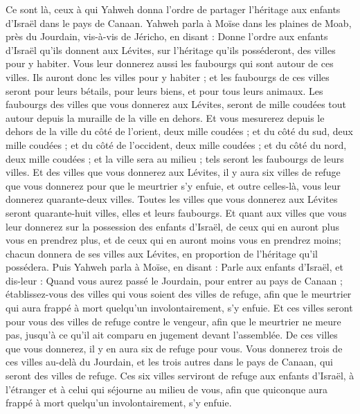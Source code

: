 \begin{multicols}{2}
Ce sont là, ceux à qui Yahweh donna l'ordre de partager l'héritage aux enfants d'Israël dans le pays de Canaan.
\VerseOne{}Yahweh parla à Moïse dans les plaines de Moab, près du Jourdain, vis-à-vis de Jéricho, en disant :
Donne l'ordre aux enfants d'Israël qu’ils donnent aux Lévites, sur l'héritage qu'ils posséderont, des villes pour y habiter. Vous leur donnerez aussi les faubourgs qui sont autour de ces villes.
Ils auront donc les villes pour y habiter ; et les faubourgs de ces villes seront pour leurs bétails, pour leurs biens, et pour tous leurs animaux.
Les faubourgs des villes que vous donnerez aux Lévites, seront de mille coudées tout autour depuis la muraille de la ville en dehors.
Et vous mesurerez depuis le dehors de la ville du côté de l'orient, deux mille coudées ; et du côté du sud, deux mille coudées ; et du côté de l'occident, deux mille coudées ; et du côté du nord, deux mille coudées ; et la ville sera au milieu ; tels seront les faubourgs de leurs villes.
Et des villes que vous donnerez aux Lévites, il y aura six villes de refuge que vous donnerez pour que le meurtrier s’y enfuie, et outre celles-là, vous leur donnerez quarante-deux villes.
Toutes les villes que vous donnerez aux Lévites seront quarante-huit villes, elles et leurs faubourgs.
Et quant aux villes que vous leur donnerez sur la possession des enfants d'Israël, de ceux qui en auront plus vous en prendrez plus, et de ceux qui en auront moins vous en prendrez moins; chacun donnera de ses villes aux Lévites, en proportion de l'héritage qu'il possédera.
Puis Yahweh parla à Moïse, en disant :
Parle aux enfants d'Israël, et dis-leur : Quand vous aurez passé le Jourdain, pour entrer au pays de Canaan ;
établissez-vous des villes qui vous soient des villes de refuge, afin que le meurtrier qui aura frappé à mort quelqu'un involontairement, s’y enfuie.
Et ces villes seront pour vous des villes de refuge contre le vengeur, afin que le meurtrier ne meure pas, jusqu'à ce qu'il ait comparu en jugement devant l'assemblée.
De ces villes que vous donnerez, il y en aura six de refuge pour vous.
Vous donnerez trois de ces villes au-delà du Jourdain, et les trois autres dans le pays de Canaan, qui seront des villes de refuge.
Ces six villes serviront de refuge aux enfants d'Israël, à l'étranger et à celui qui séjourne au milieu de vous, afin que quiconque aura frappé à mort quelqu'un involontairement, s’y enfuie.

\end{multicols}
